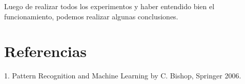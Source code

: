 Luego de realizar todos los experimentos y haber entendido bien el funcionamiento, podemos realizar algunas conclusiones.

\section{Referencias}
1. Pattern Recognition and Machine Learning by C. Bishop, Springer 2006. 